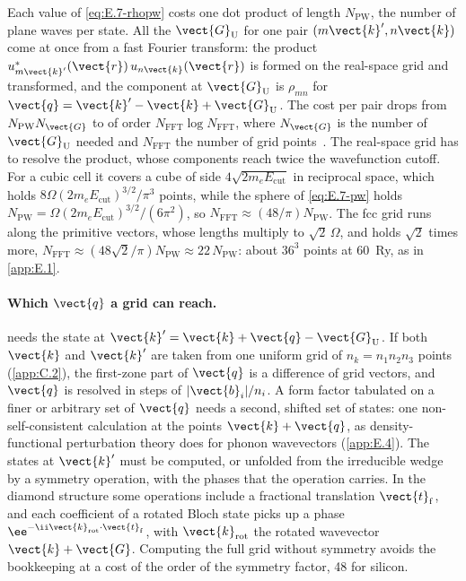 Each value of \cref{eq:E.7-rhopw} costs one dot product of length $N_{\mathrm{PW}}$, the number of plane waves per state. All the $\vect{G}_{\mathrm{U}}$ for one pair $(m\vect{k}', n\vect{k})$ come at once from a fast Fourier transform: the product $u^*_{m\vect{k}'}(\vect{r})\,u_{n\vect{k}}(\vect{r})$ is formed on the real-space grid and transformed, and the component at $\vect{G}_{\mathrm{U}}$ is $\rho_{mn}$ for $\vect{q} = \vect{k}' - \vect{k} + \vect{G}_{\mathrm{U}}$. The cost per pair drops from $N_{\mathrm{PW}}N_{\vect{G}}$ to of order $N_{\mathrm{FFT}}\log N_{\mathrm{FFT}}$, where $N_{\vect{G}}$ is the number of $\vect{G}_{\mathrm{U}}$ needed and $N_{\mathrm{FFT}}$ the number of grid points~\cite[below Eq.~(3.15)]{griffin2021extended}. The real-space grid has to resolve the product, whose components reach twice the wavefunction cutoff. For a cubic cell it covers a cube of side $4\sqrt{2m_eE_{\mathrm{cut}}}$ in reciprocal space, which holds $8\Omega(2m_eE_{\mathrm{cut}})^{3/2}/\pi^3$ points, while the sphere of \cref{eq:E.7-pw} holds $N_{\mathrm{PW}} = \Omega(2m_eE_{\mathrm{cut}})^{3/2}/(6\pi^2)$, so $N_{\mathrm{FFT}} \approx (48/\pi)N_{\mathrm{PW}}$. The fcc grid runs along the primitive vectors, whose lengths multiply to $\sqrt2\,\Omega$, and holds $\sqrt2$ times more, $N_{\mathrm{FFT}} \approx (48\sqrt2/\pi)N_{\mathrm{PW}} \approx 22\,N_{\mathrm{PW}}$: about $36^3$ points at \SI{60}{Ry}, as in \cref{app:E.1}.

\paragraph{Which $\vect{q}$ a grid can reach.}  needs the state at $\vect{k}' = \vect{k}+\vect{q} - \vect{G}_{\mathrm{U}}$. If both $\vect{k}$ and $\vect{k}'$ are taken from one uniform grid of $n_k = n_1n_2n_3$ points (\cref{app:C.2}), the first-zone part of $\vect{q}$ is a difference of grid vectors, and $\vect{q}$ is resolved in steps of $|\vect{b}_i|/n_i$. A form factor tabulated on a finer or arbitrary set of $\vect{q}$ needs a second, shifted set of states: one non-self-consistent calculation at the points $\vect{k}+\vect{q}$, as density-functional perturbation theory does for phonon wavevectors (\cref{app:E.4}). The states at $\vect{k}'$ must be computed, or unfolded from the irreducible wedge by a symmetry operation, with the phases that the operation carries. In the diamond structure some operations include a fractional translation $\vect{t}_{\mathrm{f}}$, and each coefficient of a rotated Bloch state picks up a phase $\ee^{-\ii\vect{k}_{\mathrm{rot}}\cdot\vect{t}_{\mathrm{f}}}$, with $\vect{k}_{\mathrm{rot}}$ the rotated wavevector $\vect{k}+\vect{G}$. Computing the full grid without symmetry avoids the bookkeeping at a cost of the order of the symmetry factor, 48 for silicon.

